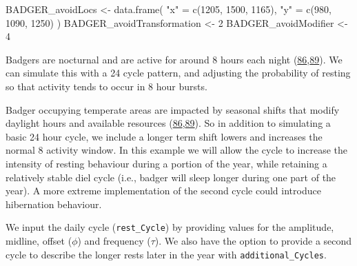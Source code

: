 \documentclass[10pt,a4paper]{article}
\newenvironment{Shaded}{}{}
\newcommand{\DecValTok}[1]{#1}
\newcommand{\FunctionTok}[1]{#1}
\newcommand{\NormalTok}[1]{#1}
\newcommand{\OtherTok}[1]{#1}
\newcommand{\StringTok}[1]{#1}
\begin{document}
\begin{Shaded}
\begin{Highlighting}[]
\NormalTok{BADGER\_avoidLocs }\OtherTok{\textless{}{-}} \FunctionTok{data.frame}\NormalTok{(}
  \StringTok{"x"} \OtherTok{=} \FunctionTok{c}\NormalTok{(}\DecValTok{1205}\NormalTok{, }\DecValTok{1500}\NormalTok{, }\DecValTok{1165}\NormalTok{),}
  \StringTok{"y"} \OtherTok{=} \FunctionTok{c}\NormalTok{(}\DecValTok{980}\NormalTok{, }\DecValTok{1090}\NormalTok{, }\DecValTok{1250}\NormalTok{)}
\NormalTok{)}
\NormalTok{BADGER\_avoidTransformation }\OtherTok{\textless{}{-}} \DecValTok{2}
\NormalTok{BADGER\_avoidModifier }\OtherTok{\textless{}{-}} \DecValTok{4}
\end{Highlighting}
\end{Shaded}

Badgers are nocturnal and are active for around 8 hours each night (\protect\hyperlink{ref-rosalino_activity_2005}{86},\protect\hyperlink{ref-magowan_dead-reckoning_2022}{89}).
We can simulate this with a 24 cycle pattern, and adjusting the probability of resting so that activity tends to occur in 8 hour bursts.

Badger occupying temperate areas are impacted by seasonal shifts that modify daylight hours and available resources (\protect\hyperlink{ref-rosalino_activity_2005}{86},\protect\hyperlink{ref-magowan_dead-reckoning_2022}{89}).
So in addition to simulating a basic 24 hour cycle, we include a longer term shift lowers and increases the normal 8 activity window.
In this example we will allow the cycle to increase the intensity of resting behaviour during a portion of the year, while retaining a relatively stable diel cycle (i.e., badger will sleep longer during one part of the year).
A more extreme implementation of the second cycle could introduce hibernation behaviour.

We input the daily cycle (\texttt{rest\_Cycle}) by providing values for the amplitude, midline, offset (\(\phi\)) and frequency (\(\tau\)).
We also have the option to provide a second cycle to describe the longer rests later in the year with \texttt{additional\_Cycles}.
\end{document}
